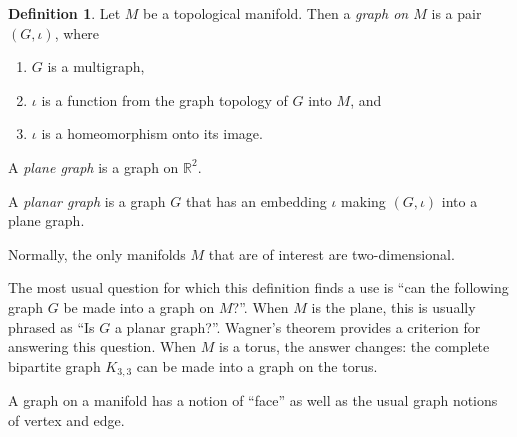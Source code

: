 \documentclass{article}
\theoremstyle{definition}
\newtheorem*{defn}{Definition}
\begin{document}
\begin{defn}
Let $M$ be a topological manifold.  Then a \emph{graph on $M$} is a pair $(G,\iota)$, where 
\begin{enumerate}
\item $G$ is a multigraph, 
\item $\iota$ is a function from the graph topology of $G$ into $M$, and
\item $\iota$ is a homeomorphism onto its image.
\end{enumerate}
A \emph{plane graph} is a graph on $\mathbb{R}^2$. 

A \emph{planar graph} is a graph $G$ that has an embedding $\iota$ making $(G,\iota)$ into a plane graph.
\end{defn}

Normally, the only manifolds $M$ that are of interest are two-dimensional.  

The most usual question for which this definition finds a use is ``can the following graph $G$ be made into a graph on $M$?''.  When $M$ is the plane, this is usually phrased as ``Is $G$ a planar graph?''.  Wagner's theorem provides a  criterion for answering this question.  When $M$ is a torus, the answer changes: the complete bipartite graph $K_{3,3}$ can be made into a graph on the torus. 

A graph on a manifold has a notion of ``face'' as well as the usual graph notions of vertex and edge.
\end{document}
